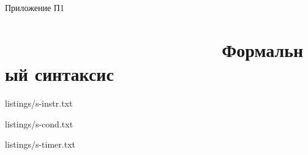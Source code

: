 \begin{flushleft}
	Приложение П1
\end{flushleft}
\setcounter{secnumdepth}{0}
\section[Приложение П1. Формальный синтаксис]{                      Формальный синтаксис}


\renewcommand{\thelstlisting}{П1.\arabic{lstlisting}}
\setcounter{lstlisting}{0}


{listings/s-instr.txt}


{listings/s-cond.txt}


{listings/s-timer.txt}
